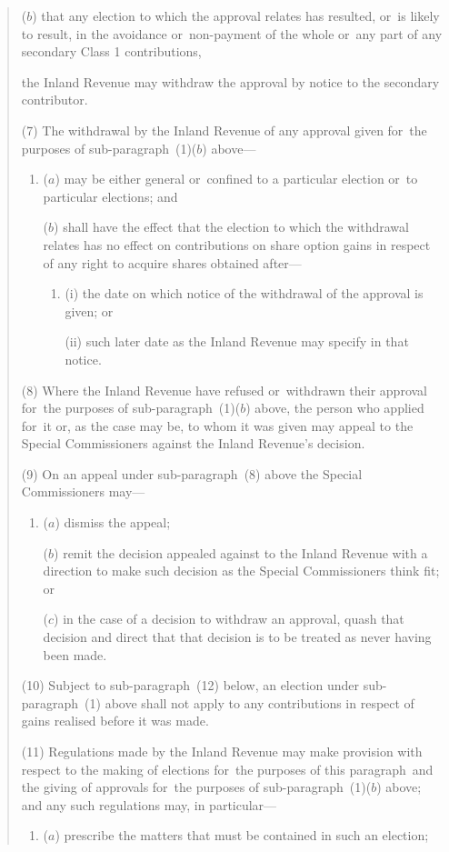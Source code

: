 \documentclass[12pt,a4paper]{article}
\begin{document}
\begin{quotation}
\begin{enumerate}
($b$) that any election to which the approval relates has resulted, or~is likely to result, in the avoidance or~non-payment of the whole or~any part of any secondary Class 1 contributions,
\end{enumerate}
the Inland Revenue may withdraw the approval by notice to the secondary contributor.

(7) The withdrawal by the Inland Revenue of any approval given for~the purposes of sub-paragraph~(1)($b$)  above—
\begin{enumerate}\item[]
($a$) may be either general or~confined to a particular election or~to particular elections; and

($b$) shall have the effect that the election to which the withdrawal relates has no effect on contributions on share option gains in respect of any right to acquire shares obtained after—
\begin{enumerate}\item[]
(i) the date on which notice of the withdrawal of the approval is given; or

(ii) such later date as the Inland Revenue may specify in that notice.
\end{enumerate}
\end{enumerate}

(8) Where the Inland Revenue have refused or~withdrawn their approval for~the purposes of sub-paragraph~(1)($b$)  above, the person who applied for~it or, as the case may be, to whom it was given may appeal to the Special Commissioners against the Inland Revenue’s decision.

(9) On an appeal under sub-paragraph~(8)  above the Special Commissioners may—
\begin{enumerate}\item[]
($a$) dismiss the appeal;

($b$) remit the decision appealed against to the Inland Revenue with a direction to make such decision as the Special Commissioners think fit; or

($c$) in the case of a decision to withdraw an approval, quash that decision and direct that that decision is to be treated as never having been made.
\end{enumerate}

(10) Subject to sub-paragraph~(12)  below, an election under sub-paragraph~(1)  above shall not apply to any contributions in respect of gains realised before it was made.

(11) Regulations made by the Inland Revenue may make provision with respect to the making of elections for~the purposes of this paragraph~and the giving of approvals for~the purposes of sub-paragraph~(1)($b$)  above; and any such regulations may, in particular—
\begin{enumerate}\item[]
($a$) prescribe the matters that must be contained in such an election;


\end{enumerate}
\end{quotation}
\end{document}
